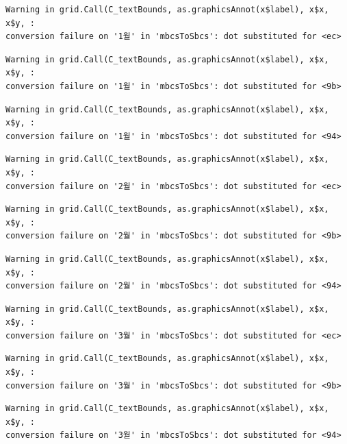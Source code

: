 \documentclass[
  letterpaper,
  DIV=11,
  numbers=noendperiod]{scrreprt}
\begin{document}
\begin{verbatim}
Warning in grid.Call(C_textBounds, as.graphicsAnnot(x$label), x$x, x$y, :
conversion failure on '1월' in 'mbcsToSbcs': dot substituted for <ec>
\end{verbatim}

\begin{verbatim}
Warning in grid.Call(C_textBounds, as.graphicsAnnot(x$label), x$x, x$y, :
conversion failure on '1월' in 'mbcsToSbcs': dot substituted for <9b>
\end{verbatim}

\begin{verbatim}
Warning in grid.Call(C_textBounds, as.graphicsAnnot(x$label), x$x, x$y, :
conversion failure on '1월' in 'mbcsToSbcs': dot substituted for <94>
\end{verbatim}

\begin{verbatim}
Warning in grid.Call(C_textBounds, as.graphicsAnnot(x$label), x$x, x$y, :
conversion failure on '2월' in 'mbcsToSbcs': dot substituted for <ec>
\end{verbatim}

\begin{verbatim}
Warning in grid.Call(C_textBounds, as.graphicsAnnot(x$label), x$x, x$y, :
conversion failure on '2월' in 'mbcsToSbcs': dot substituted for <9b>
\end{verbatim}

\begin{verbatim}
Warning in grid.Call(C_textBounds, as.graphicsAnnot(x$label), x$x, x$y, :
conversion failure on '2월' in 'mbcsToSbcs': dot substituted for <94>
\end{verbatim}

\begin{verbatim}
Warning in grid.Call(C_textBounds, as.graphicsAnnot(x$label), x$x, x$y, :
conversion failure on '3월' in 'mbcsToSbcs': dot substituted for <ec>
\end{verbatim}

\begin{verbatim}
Warning in grid.Call(C_textBounds, as.graphicsAnnot(x$label), x$x, x$y, :
conversion failure on '3월' in 'mbcsToSbcs': dot substituted for <9b>
\end{verbatim}

\begin{verbatim}
Warning in grid.Call(C_textBounds, as.graphicsAnnot(x$label), x$x, x$y, :
conversion failure on '3월' in 'mbcsToSbcs': dot substituted for <94>
\end{verbatim}
\end{document}
